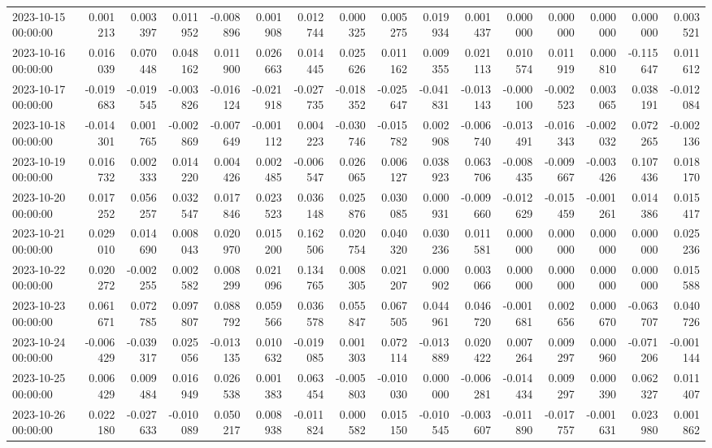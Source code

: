 \begin{tabular}{lrrrrrrrrrrrrrrr}
2023-10-15 00:00:00 & 0.001213 & 0.003397 & 0.011952 & -0.008896 & 0.001908 & 0.012744 & 0.000325 & 0.005275 & 0.019934 & 0.001437 & 0.000000 & 0.000000 & 0.000000 & 0.000000 & 0.003521 \\
2023-10-16 00:00:00 & 0.016039 & 0.070448 & 0.048162 & 0.011900 & 0.026663 & 0.014445 & 0.025626 & 0.011162 & 0.009355 & 0.021113 & 0.010574 & 0.011919 & 0.000810 & -0.115647 & 0.011612 \\
2023-10-17 00:00:00 & -0.019683 & -0.019545 & -0.003826 & -0.016124 & -0.021918 & -0.027735 & -0.018352 & -0.025647 & -0.041831 & -0.013143 & -0.000100 & -0.002523 & 0.003065 & 0.038191 & -0.012084 \\
2023-10-18 00:00:00 & -0.014301 & 0.001765 & -0.002869 & -0.007649 & -0.001112 & 0.004223 & -0.030746 & -0.015782 & 0.002908 & -0.006740 & -0.013491 & -0.016343 & -0.002032 & 0.072265 & -0.002136 \\
2023-10-19 00:00:00 & 0.016732 & 0.002333 & 0.014220 & 0.004426 & 0.002485 & -0.006547 & 0.026065 & 0.006127 & 0.038923 & 0.063706 & -0.008435 & -0.009667 & -0.003426 & 0.107436 & 0.018170 \\
2023-10-20 00:00:00 & 0.017252 & 0.056257 & 0.032547 & 0.017846 & 0.023523 & 0.036148 & 0.025876 & 0.030085 & 0.000931 & -0.009660 & -0.012629 & -0.015459 & -0.001261 & 0.014386 & 0.015417 \\
2023-10-21 00:00:00 & 0.029010 & 0.014690 & 0.008043 & 0.020970 & 0.015200 & 0.162506 & 0.020754 & 0.040320 & 0.030236 & 0.011581 & 0.000000 & 0.000000 & 0.000000 & 0.000000 & 0.025236 \\
2023-10-22 00:00:00 & 0.020272 & -0.002255 & 0.002582 & 0.008299 & 0.021096 & 0.134765 & 0.008305 & 0.021207 & 0.000902 & 0.003066 & 0.000000 & 0.000000 & 0.000000 & 0.000000 & 0.015588 \\
2023-10-23 00:00:00 & 0.061671 & 0.072785 & 0.097807 & 0.088792 & 0.059566 & 0.036578 & 0.055847 & 0.067505 & 0.044961 & 0.046720 & -0.001681 & 0.002656 & 0.000670 & -0.063707 & 0.040726 \\
2023-10-24 00:00:00 & -0.006429 & -0.039317 & 0.025056 & -0.013135 & 0.010632 & -0.019085 & 0.001303 & 0.072114 & -0.013889 & 0.020422 & 0.007264 & 0.009297 & 0.000960 & -0.071206 & -0.001144 \\
2023-10-25 00:00:00 & 0.006429 & 0.009484 & 0.016949 & 0.026538 & 0.001383 & 0.063454 & -0.005803 & -0.010030 & 0.000000 & -0.006281 & -0.014434 & 0.009297 & 0.000390 & 0.062327 & 0.011407 \\
2023-10-26 00:00:00 & 0.022180 & -0.027633 & -0.010089 & 0.050217 & 0.008938 & -0.011824 & 0.000582 & 0.015150 & -0.010545 & -0.003607 & -0.011890 & -0.017757 & -0.001631 & 0.023980 & 0.001862 \\

\end{tabular}
